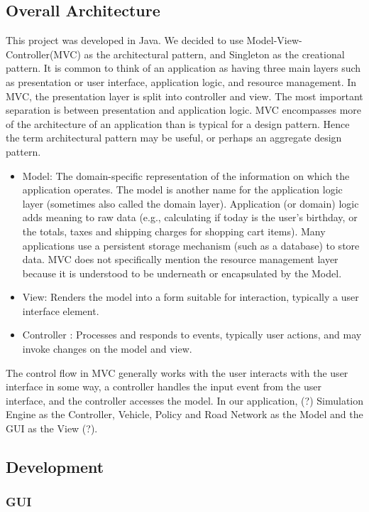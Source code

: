 \documentclass[11pt]{article}
\begin{document}
\subsection{Overall Architecture}
This project was developed in Java. We decided to use Model-View-Controller(MVC) as the architectural pattern, and Singleton as the creational pattern. It is common to think of an application as having three main
layers such as presentation or user interface, application logic, and resource management. In MVC, the presentation
layer is split into controller and view. The most important separation is between presentation and
application logic. MVC encompasses more of the architecture of an application than is typical for a design pattern. Hence the term architectural pattern may be useful, or perhaps an aggregate design pattern.
    \begin{itemize}
    \item Model: The domain-specific representation of the information on which the application operates.
    The model is another name for the application logic layer (sometimes also called the
    domain layer). Application (or domain) logic adds meaning to raw data (e.g., calculating if today
    is the user’s birthday, or the totals, taxes and shipping charges for shopping cart items).
    Many applications use a persistent storage mechanism (such as a database) to store data.
    MVC does not specifically mention the resource management layer because it is understood
    to be underneath or encapsulated by the Model.
    \item View: Renders the model into a form suitable for interaction, typically a user interface
    element.
    \item Controller : Processes and responds to events, typically user actions, and may invoke changes
    on the model and view.
    \end{itemize}

The control flow in MVC generally works with the user interacts with the user interface in some way, a controller handles the input event from the user interface, and the controller accesses the model. In our application, (?)
Simulation Engine as the Controller, Vehicle, Policy and Road Network as the Model and the GUI as the View (?). 


\subsection{Development}
\subsubsection{GUI}
\end{document}
